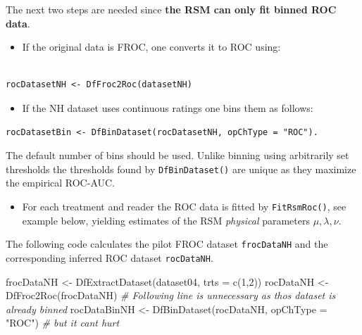 \documentclass[
]{book}
\newenvironment{Shaded}{\begin{snugshade}}{\end{snugshade}}
\newcommand{\AttributeTok}[1]{\textcolor[rgb]{0.77,0.63,0.00}{#1}}
\newcommand{\CommentTok}[1]{\textcolor[rgb]{0.56,0.35,0.01}{\textit{#1}}}
\newcommand{\DecValTok}[1]{\textcolor[rgb]{0.00,0.00,0.81}{#1}}
\newcommand{\FunctionTok}[1]{\textcolor[rgb]{0.00,0.00,0.00}{#1}}
\newcommand{\NormalTok}[1]{#1}
\newcommand{\OtherTok}[1]{\textcolor[rgb]{0.56,0.35,0.01}{#1}}
\newcommand{\StringTok}[1]{\textcolor[rgb]{0.31,0.60,0.02}{#1}}
\providecommand{\tightlist}{%
  \setlength{\itemsep}{0pt}\setlength{\parskip}{0pt}}
\begin{document}
The next two steps are needed since \textbf{the RSM can only fit binned ROC data}.

\begin{itemize}
\tightlist
\item
  If the original data is FROC, one converts it to ROC using:
\end{itemize}

\begin{verbatim}

rocDatasetNH <- DfFroc2Roc(datasetNH) 
\end{verbatim}

\begin{itemize}
\tightlist
\item
  If the NH dataset uses continuous ratings one bins them as follows:
\end{itemize}

\begin{verbatim}
rocDatasetBin <- DfBinDataset(rocDatasetNH, opChType = "ROC"). 
\end{verbatim}

The default number of bins should be used. Unlike binning using arbitrarily set thresholds the thresholds found by \texttt{DfBinDataset()} are unique as they maximize the empirical ROC-AUC.

\begin{itemize}
\tightlist
\item
  For each treatment and reader the ROC data is fitted by \texttt{FitRsmRoc()}, see example below, yielding estimates of the RSM \emph{physical} parameters \(\mu, \lambda, \nu\).
\end{itemize}

The following code calculates the pilot FROC dataset \texttt{frocDataNH} and the corresponding inferred ROC dataset \texttt{rocDataNH}.

\begin{Shaded}
\begin{Highlighting}[]
\NormalTok{frocDataNH }\OtherTok{\textless{}{-}} \FunctionTok{DfExtractDataset}\NormalTok{(dataset04, }\AttributeTok{trts =} \FunctionTok{c}\NormalTok{(}\DecValTok{1}\NormalTok{,}\DecValTok{2}\NormalTok{))}
\NormalTok{rocDataNH }\OtherTok{\textless{}{-}} \FunctionTok{DfFroc2Roc}\NormalTok{(frocDataNH)}
\CommentTok{\# Following line is unnecessary as thos dataset is already binned}
\NormalTok{rocDataBinNH }\OtherTok{\textless{}{-}} \FunctionTok{DfBinDataset}\NormalTok{(rocDataNH, }\AttributeTok{opChType =} \StringTok{"ROC"}\NormalTok{)}
\CommentTok{\# but it cant hurt}
\end{Highlighting}
\end{Shaded}
\end{document}
